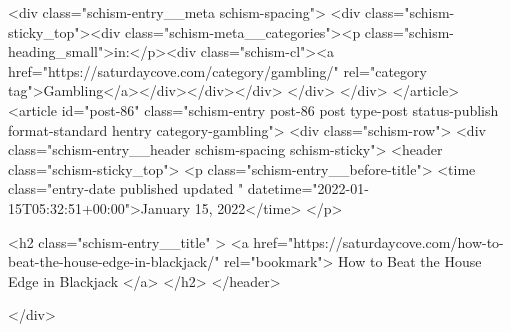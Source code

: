 {		<div class="schism-entry__meta schism-spacing">			<div class="schism-sticky_top"><div class="schism-meta__categories"><p class="schism-heading_small">in:</p><div class="schism-cl"><a href="https://saturdaycove.com/category/gambling/" rel="category tag">Gambling</a></div></div></div>		</div>
	</div>
</article>
<article id="post-86" class="schism-entry post-86 post type-post status-publish format-standard hentry category-gambling">
	<div class="schism-row">		<div class="schism-entry__header schism-spacing schism-sticky">			<header class="schism-sticky_top">				<p class="schism-entry__before-title">
					<time class="entry-date published updated " datetime="2022-01-15T05:32:51+00:00">January 15, 2022</time>				</p>

				<h2 class="schism-entry__title" >
					<a href="https://saturdaycove.com/how-to-beat-the-house-edge-in-blackjack/" rel="bookmark">
						How to Beat the House Edge in Blackjack					</a>
				</h2>
			</header>

					</div>

}
